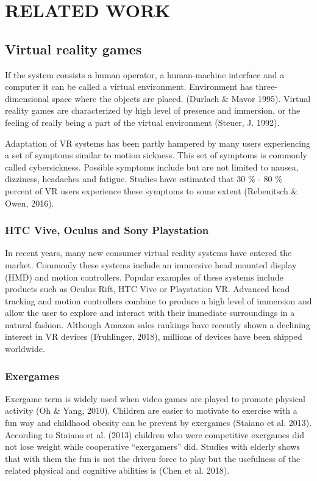 \documentclass{sig-alternate-05-2015}
\begin{document}
\section{RELATED WORK}
\subsection{Virtual reality games}
If the system consists a human operator, a human-machine interface and 
a computer it can be called a virtual environment. Environment has 
three-dimensional space where the objects are placed. 
(Durlach \& Mavor 1995). Virtual reality games are characterized by high 
level of presence and immersion, or the feeling of really being a part 
of the virtual environment (Steuer, J. 1992).

Adaptation of VR systems has been partly hampered by many users 
experiencing a set of symptoms similar to motion sickness. This set 
of symptoms is commonly called cybersickness. Possible symptoms include 
but are not limited to nausea, dizziness, headaches and fatigue. 
Studies have estimated that 30 \% - 80 \% percent of VR users 
experience these symptoms to some extent (Rebenitsch \& Owen, 2016).

\subsubsection{HTC Vive, Oculus and Sony Playstation}
In recent years, many new consumer virtual reality systems have entered 
the market. Commonly these systems include an immersive head mounted 
display (HMD) and motion controllers. Popular examples of these systems 
include products such as Oculus Rift, HTC Vive or Playstation VR. Advanced 
head tracking and motion controllers combine to produce a high level of 
immersion and allow the user to explore and interact with their immediate 
surroundings in a natural fashion. Although Amazon sales rankings have 
recently shown a declining interest in VR devices (Fruhlinger, 2018), 
millions of devices have been shipped worldwide.

\subsubsection{Exergames}
Exergame term is widely used when video games are played to promote 
physical activity (Oh \& Yang, 2010). Children are easier to motivate 
to exercise with a fun way and childhood obesity can be prevent by 
exergames (Staiano et al. 2013). According to Staiano et al. (2013) 
children who were competitive exergames did not lose weight while 
cooperative “exergamers” did. Studies with elderly shows that with 
them the fun is not the driven force to play but the usefulness of 
the related physical and cognitive abilities is (Chen et al. 2018).
\end{document}
